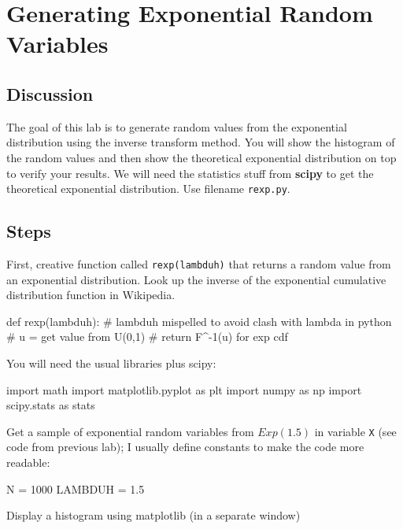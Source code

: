 \chapter{Generating Exponential Random Variables}

\setcounter{problem}{1}
\section{Discussion}

\begin{fullwidth}

The goal of this lab is to generate random values from the exponential distribution using the inverse transform method.  You will show the histogram of the random values and then show the theoretical exponential distribution on top to verify your results. We will need the statistics stuff from {\bf scipy} to get the theoretical exponential distribution. Use filename {\tt rexp.py}.

\section{Steps}

\step First, creative function called {\tt rexp(lambduh)} that returns a random value from an exponential distribution. Look up the inverse of the exponential cumulative distribution function in Wikipedia.

\begin{pyverbatim}
def rexp(lambduh): # lambduh mispelled to avoid clash with lambda in python
    # u = get value from U(0,1)
    # return F^-1(u) for exp cdf
\end{pyverbatim}

\step You will need the usual libraries plus scipy:

\begin{pyverbatim}
import math
import matplotlib.pyplot as plt
import numpy as np
import scipy.stats as stats
\end{pyverbatim}

\step Get a sample of exponential random variables from $Exp(1.5)$ in variable {\tt X} (see code from previous lab); I usually define constants to make the code more readable:

\begin{pyverbatim}
N = 1000
LAMBDUH = 1.5
\end{pyverbatim}

\step Display a histogram using matplotlib (in a separate window)


\end{fullwidth}
